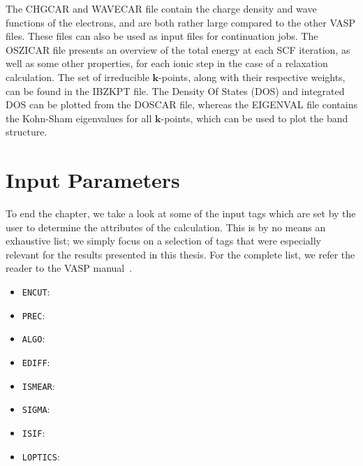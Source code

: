 \begin{refsection}
The CHGCAR and WAVECAR file contain the charge density and wave functions of 
the electrons, and are both rather large compared to the other VASP files. 
These files can also be used as input files for continuation jobs. The OSZICAR 
file presents an overview of the total energy at each SCF iteration, as well 
as some other properties, for each ionic step in the case of a relaxation 
calculation. The set of irreducible $\mathbf{k}$-points, along with their 
respective weights, can be found in the IBZKPT file. The Density Of States 
(DOS) and integrated DOS can be plotted from the DOSCAR file, whereas the 
EIGENVAL file contains the Kohn-Sham eigenvalues for all $\mathbf{k}$-points, 
which can be used to plot the band structure. 
 
\section{Input Parameters} \label{sec:input} 
 
To end the chapter, we take a look at some of the input tags which are set by 
the user to determine the attributes of the calculation. This is by no means 
an exhaustive list; we simply focus on a selection of tags that were 
especially relevant for the results presented in this thesis. For the complete 
list, we refer the reader to the VASP manual~\cite{vasp}. 
 
\begin{itemize} 
 
 \label{appendix:sec-ENCUT} 
\item \texttt{ENCUT}:  
 
 \label{appendix:sec-PREC} 
\item \texttt{PREC}:  
 
 \label{appendix:sec-ALGO} 
\item \texttt{ALGO}:  
 
 \label{appendix:sec-EDIFF} 
\item \texttt{EDIFF}:  
 
 \label{appendix:sec-ISMEAR} 
\item \texttt{ISMEAR}:  
 
 \label{appendix:sec-SIGMA} 
\item \texttt{SIGMA}:  
 
 \label{appendix:sec-ISIF} 
\item \texttt{ISIF}:  
 
 \label{appendix:sec-LOPTICS} 
\item \texttt{LOPTICS}:  
 

\end{itemize}
\end{refsection}
